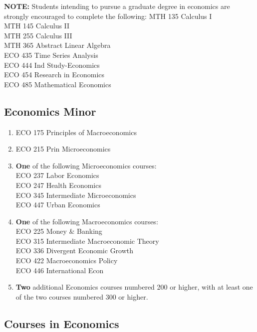 \documentclass[
  letterpaper,
]{scrbook}
\providecommand{\tightlist}{%
  \setlength{\itemsep}{0pt}\setlength{\parskip}{0pt}}
\begin{document}
\textbf{NOTE:} Students intending to pursue a graduate degree in
economics are strongly encouraged to complete the following: MTH 135
Calculus I\\
MTH 145 Calculus II\\
MTH 255 Calculus III\\
MTH 365 Abstract Linear Algebra\\
ECO 435 Time Series Analysis\\
ECO 444 Ind Study-Economics\\
ECO 454 Research in Economics\\
ECO 485 Mathematical Economics

\subsection{Economics Minor}\label{economics-minor}

\begin{enumerate}
\def\labelenumi{\arabic{enumi}.}
\tightlist
\item
  ECO 175 Principles of Macroeconomics
\item
  ECO 215 Prin Microeconomics
\item
  \textbf{One} of the following Microeconomics courses:\\
  ECO 237 Labor Economics\\
  ECO 247 Health Economics\\
  ECO 345 Intermediate Microeconomics\\
  ECO 447 Urban Economics\\
\item
  \textbf{One} of the following Macroeconomics courses:\\
  ECO 225 Money \& Banking\\
  ECO 315 Intermediate Macroeconomic Theory\\
  ECO 336 Divergent Economic Growth\\
  ECO 422 Macroeconomics Policy\\
  ECO 446 International Econ\\
\item
  \textbf{Two} additional Economics courses numbered 200 or higher, with
  at least one of the two courses numbered 300 or higher.
\end{enumerate}

\subsection{Courses in Economics}\label{courses-in-economics}
\end{document}
